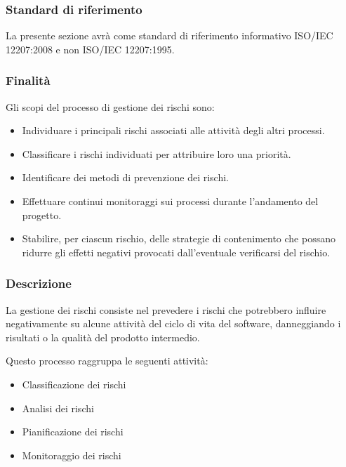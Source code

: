 \documentclass[../../norme-di-progetto.tex]{subfiles}
\begin{document}
\subsubsection{Standard di riferimento}%
\label{subs:gestione_dei_rischi/standard_di_riferimento}

La presente sezione avrà come standard di riferimento informativo ISO/IEC 12207:2008 e non ISO/IEC 12207:1995.

\subsubsection{Finalità}%
\label{subs:gestione_dei_rischi/finalita}

Gli scopi del processo di gestione dei rischi sono:

\begin{itemize}
  \item Individuare i principali rischi associati alle attività degli altri processi.
  \item Classificare i rischi individuati per attribuire loro una priorità.
  \item Identificare dei metodi di prevenzione dei rischi.
  \item Effettuare continui monitoraggi sui processi durante l'andamento del progetto.
  \item Stabilire, per ciascun rischio, delle strategie di contenimento che possano ridurre gli effetti negativi provocati dall'eventuale verificarsi del rischio.
\end{itemize}

\subsubsection{Descrizione}%
\label{subs:gestione_dei_rischi/descrizione}

La gestione dei rischi consiste nel prevedere i rischi che potrebbero influire negativamente su alcune attività del ciclo di vita del software, danneggiando i risultati o la qualità del prodotto intermedio.

Questo processo raggruppa le seguenti attività:

\begin{itemize}
  \item Classificazione dei rischi
  \item Analisi dei rischi
  \item Pianificazione dei rischi
  \item Monitoraggio dei rischi
\end{itemize}
\end{document}
